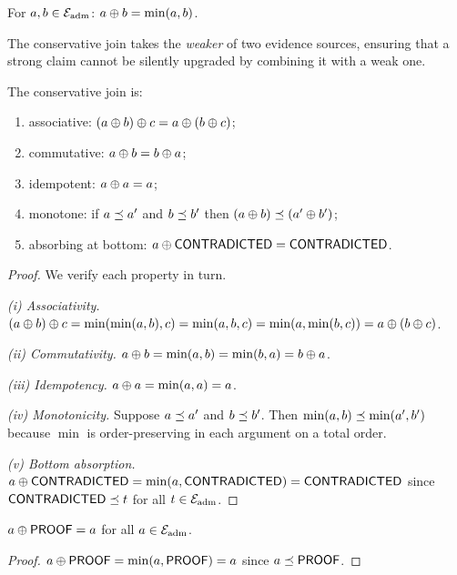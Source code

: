 \documentclass[11pt]{article}
\begin{document}
\begin{definition}\label{def:join}
For $a, b \in \mathcal{E}_{\mathrm{adm}}$: $a \oplus b = \min(a, b)$.
\end{definition}

The conservative join takes the \emph{weaker} of two
evidence sources, ensuring that a strong claim cannot be
silently upgraded by combining it with a weak one.

\begin{proposition}\label{prop:join}
The conservative join is:
\begin{enumerate}[nosep,label=(\roman*)]
  \item associative: $(a \oplus b) \oplus c = a \oplus (b \oplus c)$;
  \item commutative: $a \oplus b = b \oplus a$;
  \item idempotent: $a \oplus a = a$;
  \item monotone: if $a \preceq a'$ and $b \preceq b'$ then
        $(a \oplus b) \preceq (a' \oplus b')$;
  \item absorbing at bottom: $a \oplus \mathsf{CONTRADICTED} = \mathsf{CONTRADICTED}$.
\end{enumerate}
\end{proposition}

\begin{proof}
We verify each property in turn.

\emph{(i) Associativity.}
$(a \oplus b) \oplus c = \min(\min(a,b), c) = \min(a, b, c)
= \min(a, \min(b, c)) = a \oplus (b \oplus c)$.

\emph{(ii) Commutativity.}
$a \oplus b = \min(a, b) = \min(b, a) = b \oplus a$.

\emph{(iii) Idempotency.}
$a \oplus a = \min(a, a) = a$.

\emph{(iv) Monotonicity.}
Suppose $a \preceq a'$ and $b \preceq b'$.  Then
$\min(a, b) \preceq \min(a', b')$ because $\min$ is
order-preserving in each argument on a total order.

\emph{(v) Bottom absorption.}
$a \oplus \mathsf{CONTRADICTED} = \min(a, \mathsf{CONTRADICTED}) = \mathsf{CONTRADICTED}$
since $\mathsf{CONTRADICTED} \preceq t$ for all $t \in \mathcal{E}_{\mathrm{adm}}$.
\end{proof}

\begin{lemma}\label{lem:join-top}
$a \oplus \mathsf{PROOF} = a$ for all $a \in \mathcal{E}_{\mathrm{adm}}$.
\end{lemma}

\begin{proof}
$a \oplus \mathsf{PROOF} = \min(a, \mathsf{PROOF}) = a$ since $a \preceq \mathsf{PROOF}$.
\end{proof}
\end{document}
